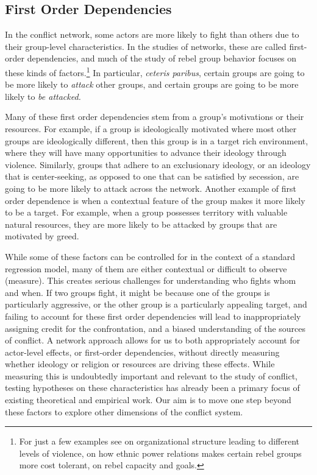 \subsection{First Order Dependencies}
In the conflict network, some actors are more likely to fight than others due to their group-level characteristics. In the studies of networks, these are called first-order dependencies, and much of the study of rebel group behavior focuses on these kinds of factors.\footnote{For just a few examples see \citet{weinstein:2007} on organizational structure leading to different levels of violence, \citet{wucherpfennig:etal:2012} on how ethnic power relations makes certain rebel groups more cost tolerant, \citet{buhaug:etal:2009} on rebel capacity and goals.}
In particular, \emph{ceteris paribus}, certain groups are going to be more likely to \emph{attack} other groups, and certain groups are going to be more likely to \emph{be attacked.}

Many of these first order dependencies stem from a group's motivations or their resources. For example, if a group is ideologically motivated where most other groups are ideologically different, then this group is in a target rich environment, where they will have many opportunities to advance their ideology through violence. Similarly, groups that adhere to an exclusionary ideology, or an ideology that is center-seeking, as opposed to one that can be satisfied by secession, are going to be more likely to attack across the network. Another example of first order dependence is when a contextual feature of the group makes it more likely to be a target. For example, when a group possesses territory with valuable natural resources, they are more likely to be attacked by groups that are motivated by greed. 

While some of these factors can be controlled for in the context of a standard regression model, many of them are either contextual or difficult to observe (measure). This creates serious challenges for understanding who fights whom and when. If two groups fight, it might be because one of the groups is particularly aggressive, or the other group is a particularly appealing target, and failing to account for these first order dependencies will lead to inappropriately assigning credit for the confrontation, and a biased understanding of the sources of conflict. A network approach allows for us to both appropriately account for actor-level effects, or first-order dependencies, without directly measuring whether ideology or religion or resources are driving these effects. While measuring this is undoubtedly important and relevant to the study of conflict, testing hypotheses on these characteristics has already been a primary focus of existing theoretical and empirical work. Our aim is to move one step beyond these factors to explore other dimensions of the conflict system.


